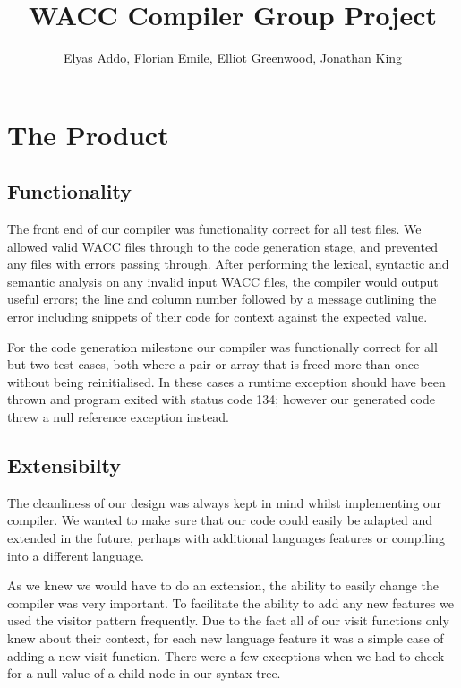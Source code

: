 \documentclass[11pt,a4paper]{article}
\begin{document}
\title{WACC Compiler Group Project}
\author{Elyas Addo, Florian Emile, Elliot Greenwood, Jonathan King}

\maketitle

\section{The Product}
\label{sec:The Product}

\subsection{Functionality}
\label{sub:Functionality}

The front end of our compiler was functionality correct for all test files. We allowed valid WACC files through to the code generation stage, and prevented any files with errors passing through. After performing the lexical, syntactic and semantic analysis on any invalid input WACC files, the compiler would output useful errors; the line and column number followed by a message outlining the error including snippets of their code for context against the expected value.

For the code generation milestone our compiler was functionally correct for all but two test cases, both where a pair or array that is freed more than once without being reinitialised. In these cases a runtime exception should have been thrown and program exited with status code 134; however our generated code threw a null reference exception instead.

\subsection{Extensibilty}
\label{subs:Extensibilty}

The cleanliness of our design was always kept in mind whilst implementing our compiler. We wanted to make sure that our code could easily be adapted and extended in the future, perhaps with additional languages features or compiling into a different language.

As we knew we would have to do an extension, the ability to easily change the compiler was very important. To facilitate the ability to add any new features we used the visitor pattern frequently. Due to the fact all of our visit functions only knew about their context, for each new language feature it was a simple case of adding a new visit function. There were a few exceptions when we had to check for a null value of a child node in our syntax tree.
\end{document}
